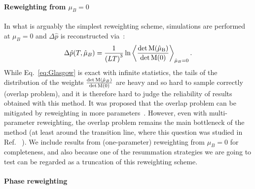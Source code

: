 \documentclass[twocolumn,showpacs,preprintnumbers,amsmath,amssymb,latexsym,prl,footinbib,floatfix,superscriptaddress]{revtex4-2}
\begin{document}
\paragraph{Reweighting from $\mu_B=0$} 
In what is arguably the simplest reweighting scheme, simulations
are performed at $\mu_B = 0$ and $\Delta \hat{p}$ is reconstructed via~\cite{Barbour:1997ej}:
\begin{equation}
    \label{eq:Glasgow}
    \Delta\hat{p}(T,\hat{\mu}_B) = \frac{1}{\left( LT \right)^3} \ln \left\langle \frac{\det \rm{M}(\hat{\mu}_B)}{\det \rm{M}(0)} \right\rangle_{\hat{\mu}_B=0} \rm{.}
\end{equation}
While Eq.~\eqref{eq:Glasgow} is exact with infinite statistics, the tails 
of the distribution of the weights $\frac{\det {\rm{M}}(\hat{\mu    }_B)}{\det {\rm{M}}(0)}$ are heavy and so hard to sample correctly (overlap problem), 
and it is therefore hard to judge the reliability of results obtained with this method.
It was proposed that the
overlap problem can be mitigated by 
reweighting in more parameters~\cite{Fodor:2001au,Fodor:2001pe,Fodor:2004nz}.
However, even with multi-parameter reweighting, the 
overlap problem remains the main bottleneck of the method (at least around the transition line, where this question was studied in Ref. ~\cite{Giordano:2020uvk}).
We include results from (one-parameter) reweighting from $\mu_B=0$ for 
completeness, and also because one of the resummation strategies we are going 
to test can be regarded as a truncation of this reweighting scheme.


\paragraph{Phase reweighting}
\end{document}
